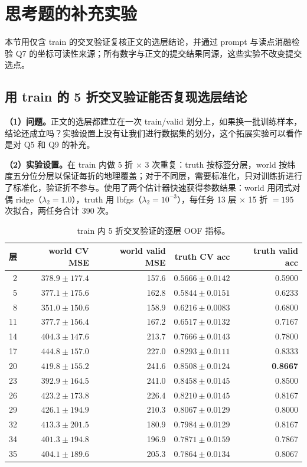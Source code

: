 \documentclass[UTF8,a4paper]{ctexart}
\begin{document}
\section{思考题的补充实验}\label{app:exp}

本节用仅含 train 的交叉验证复核正文的选层结论，并通过 prompt 与读点消融检验 Q7 的坐标可读性来源；所有数字与正文的提交结果同源，这些实验不改变提交选点。

\subsection{用 train 的 5 折交叉验证能否复现选层结论}

\textbf{（1）问题。}正文的选层都建立在一次 train/valid 划分上，如果换一批训练样本，结论还成立吗？实验设置上没有让我们进行数据集的划分，这个拓展实验可以看作是对 Q5 和 Q9 的补充。

\textbf{（2）实验设置。}在 train 内做 5 折 $\times$ 3 次重复：truth 按标签分层，world 按纬度五分位分层以保证每折的地理覆盖；对于不同层，需要标准化，只对训练折进行了标准化，验证折不参与。使用了两个估计器快速获得参数结果：world 用闭式对偶 ridge（$\lambda_2=1.0$），truth 用 lbfgs（$\lambda_2=10^{-3}$），每任务 13 层 $\times$ 15 折 $=195$ 次拟合，两任务合计 390 次。

\begin{table}[htbp]
  \centering
  \small
  \begin{tabular}{rrrrr}
    \toprule
    层 & world CV MSE & world valid MSE & truth CV acc & truth valid acc \\
    \midrule
    2  & $378.9\pm177.4$ & 157.6 & $0.5666\pm0.0142$ & 0.5900 \\
    5  & $377.1\pm175.6$ & 162.8 & $0.5844\pm0.0151$ & 0.6233 \\
    8  & $\mathbf{351.0\pm150.6}$ & 158.9 & $0.6216\pm0.0083$ & 0.6800 \\
    11 & $377.7\pm156.4$ & 167.2 & $0.6517\pm0.0132$ & 0.7167 \\
    14 & $404.3\pm147.6$ & 213.7 & $0.7666\pm0.0143$ & 0.7800 \\
    17 & $444.8\pm157.0$ & 227.0 & $0.8293\pm0.0111$ & 0.8333 \\
    20 & $419.8\pm155.2$ & 241.6 & $\mathbf{0.8508\pm0.0124}$ & \textbf{0.8667} \\
    23 & $392.9\pm164.5$ & 241.0 & $0.8458\pm0.0145$ & 0.8500 \\
    26 & $423.2\pm173.8$ & 226.4 & $0.8210\pm0.0145$ & 0.8167 \\
    29 & $426.1\pm194.9$ & 210.3 & $0.8067\pm0.0129$ & 0.8000 \\
    32 & $413.3\pm201.5$ & 180.9 & $0.7984\pm0.0129$ & 0.8167 \\
    34 & $401.3\pm194.8$ & 196.9 & $0.7871\pm0.0159$ & 0.7867 \\
    35 & $404.1\pm189.6$ & 205.3 & $0.7864\pm0.0134$ & 0.8067 \\
    \bottomrule
  \end{tabular}
  \caption{train 内 5 折交叉验证的逐层 OOF 指标。}\label{tab:cv}
\end{table}
\end{document}
